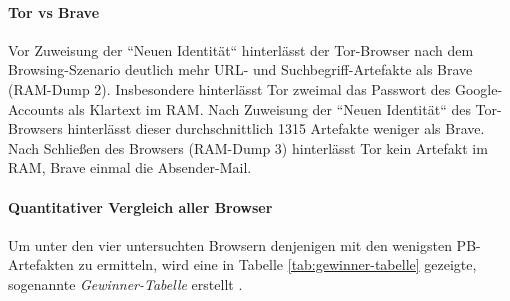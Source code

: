 \paragraph*{Tor vs Brave}
Vor Zuweisung der ``Neuen Identität`` hinterlässt der Tor-Browser nach dem Browsing-Szenario  deutlich mehr URL- und Suchbegriff-Artefakte als Brave (RAM-Dump 2). Insbesondere hinterlässt Tor zweimal das Passwort des Google-Accounts als Klartext im RAM.
Nach Zuweisung der ``Neuen Identität`` des Tor-Browsers hinterlässt dieser durchschnittlich 1315 Artefakte weniger als Brave.
Nach Schließen des Browsers (RAM-Dump 3) hinterlässt Tor kein Artefakt im RAM, Brave einmal die Absender-Mail. 

\paragraph*{Quantitativer Vergleich aller Browser}
Um unter den vier untersuchten Browsern denjenigen mit den wenigsten PB-Artefakten zu ermitteln, wird eine in Tabelle \ref{tab:gewinner-tabelle} gezeigte, sogenannte  \textit{Gewinner-Tabelle} erstellt \cite{Horsman.2019}.

